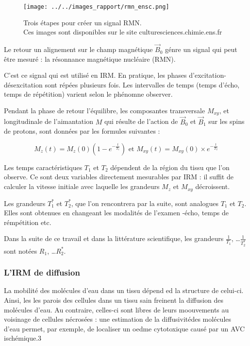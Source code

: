 \begin{figure}[!b]
\texttt{[image: ../../images\_rapport/rmn\_ensc.png]}
\caption{Trois \'etapes pour cr\'eer un signal RMN.
\\
Ces images sont disponibles sur le site culturesciences.chimie.ens.fr}
\label{irm_b01}
\end{figure}

\par
Le retour  un alignement sur le champ magn\'etique $\vec{B}_0$ g\'enre un signal qui peut \^etre mesur\'e : %
la r\'esonnance magn\'etique nucl\'eaire (RMN).

\par
C'est ce signal qui est utilis\'e en IRM. En pratique, les phases d'excitation-d\'esexcitation sont r\'ep\'ees plusieurs fois. %
Les intervalles de temps (temps d'\'echo, temps de r\'ep\'etition) varient selon le ph\'enomne  observer.

\etoile

\newpage
Pendant la phase de retour  l'\'equilibre, les composantes transversale $M_{xy}$, %
et longitudinale de l'aimantation $M$ qui r\'esulte de l'action de $\vec{B}_0$ et $\vec{B}_1$ sur les spins de protons, %
sont donn\'ees par les formules suivantes :

\[M_z(t)=M_z(0)\left(1-e^{-\frac{t}{T_1}}\right)\text{ et }M_{xy}(t)=M_{xy}(0)\times e^{-\frac{t}{T_2}}\]

Les temps caract\'eristiques $T_1$ et $T_2$ d\'ependent de la r\'egion du tissu que l'on observe. %
Ce sont deux variables directement mesurables par IRM : %
il suffit de calculer la vitesse initiale avec laquelle les grandeurs $M_z$ et $M_{xy}$ d\'ecroissent.

\par
Les grandeurs $T_1^{\ast}$ et $T_2^{\ast}$, que l'on rencontrera par la suite, sont analogues  $T_1$ et $T_2$. %
Elles sont obtenues en changeant les modalit\'es de l'examen -\'echo, temps de r\'emp\'etition etc.

\etoile
Dans la suite de ce travail et dans la litt\'erature scientifique, %
les grandeurs $\frac{1}{T_1}$, \dots $\frac{1}{T_2^{\ast}}$ sont not\'ees $R_1$, \dots $R_2^{\ast}$.

\FloatBarrier
\subsubsection{L'IRM de diffusion}

La mobilit\'e des mol\'ecules d'eau dans un tissu d\'epend ed la structure de celui-ci. %
Ainsi, les les parois des cellules dans un tissu sain freinent la diffusion des mol\'ecules d'eau. %
Au contraire, celles-ci sont libres de leurs moouvements au voisinage de cellules n\'ecros\'ees : %
une estimation de la diffusivit\'edes mol\'ecules d'eau permet, par exemple, de localiser un oedme cytotoxique caus\'e par un AVC isch\'emique.3

